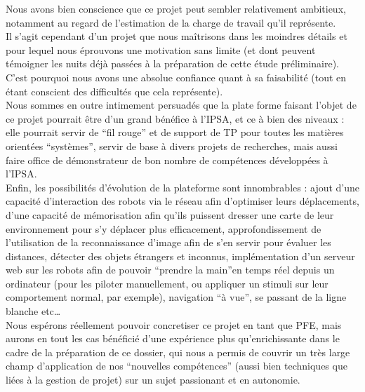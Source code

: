 Nous avons bien conscience que ce projet peut sembler relativement ambitieux, notamment au regard de l’estimation de la charge de travail qu’il représente.\\
Il s’agit cependant d’un projet que nous maîtrisons dans les moindres détails et pour lequel nous éprouvons une motivation sans limite (et dont peuvent témoigner les nuits déjà passées à la préparation de cette étude préliminaire). C’est pourquoi nous avons une absolue confiance quant à sa faisabilité (tout en étant conscient des difficultés que cela représente).\\

Nous sommes en outre intimement persuadés que la plate forme faisant l’objet de ce projet pourrait être d’un grand bénéfice à l’IPSA, et ce à bien des niveaux : elle pourrait servir de “fil rouge” et de support de TP pour toutes les matières orientées “systèmes”, servir de base à divers projets de recherches, mais aussi faire office de démonstrateur de bon nombre de compétences développées à l’IPSA.\\

Enfin, les possibilités d’évolution de la plateforme sont innombrables : ajout d’une capacité d’interaction des robots via le réseau afin d’optimiser leurs déplacements, d’une capacité de mémorisation afin qu’ils puissent dresser une carte de leur environnement pour s’y déplacer plus efficacement, approfondissement de l’utilisation de la reconnaissance d’image afin de s’en servir pour évaluer les distances, détecter des objets étrangers et inconnus, implémentation d’un serveur web sur les robots afin de pouvoir “prendre la main”en temps réel depuis un ordinateur (pour les piloter manuellement, ou appliquer un stimuli sur leur comportement normal, par exemple), navigation “à vue”, se passant de la ligne blanche etc…\\

Nous espérons réellement pouvoir concretiser ce projet en tant que PFE, mais aurons en tout les cas bénéficié d’une expérience plus qu’enrichissante dans le cadre de la préparation de ce dossier, qui nous a permis de couvrir un très large champ d’application de nos “nouvelles compétences” (aussi bien techniques que liées à la gestion de projet) sur un sujet passionant et en autonomie. 
